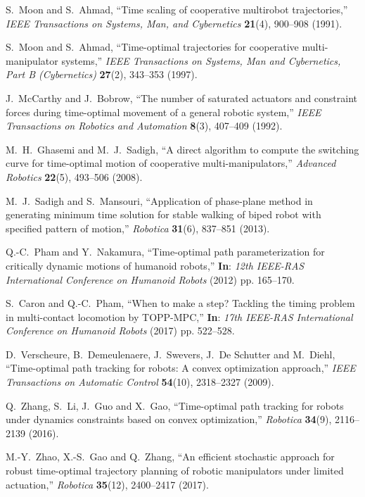 \documentclass{rob}%
\begin{document}
\begin{thebibliography}{30}
S.~Moon and S.~Ahmad, ``{Time scaling of cooperative multirobot
	trajectories},'' \emph{IEEE Transactions on Systems, Man, and Cybernetics}
\textbf{21}(4), 900--908 (1991).

S.~Moon and S.~Ahmad, ``{Time-optimal trajectories for cooperative multi-manipulator
	systems},'' \emph{IEEE Transactions on Systems, Man and Cybernetics, Part B
	(Cybernetics)} \textbf{27}(2), 343--353 (1997).

J.~McCarthy and J.~Bobrow, ``{The number of saturated actuators and constraint
	forces during time-optimal movement of a general robotic system},''
\emph{IEEE Transactions on Robotics and Automation} \textbf{8}(3), 407--409 (1992).

M.~H.~Ghasemi and M.~J.~Sadigh, ``{A direct algorithm to compute the switching
	curve for time-optimal motion of cooperative multi-manipulators},''
\emph{Advanced Robotics} \textbf{22}(5), 493--506 (2008).

M.~J.~Sadigh and S.~Mansouri, ``{Application of phase-plane method in
	generating minimum time solution for stable walking of biped robot with
	specified pattern of motion},'' \emph{Robotica} \textbf{31}(6), 837--851 (2013).

Q.-C.~Pham and Y.~Nakamura, ``{Time-optimal path parameterization for
	critically dynamic motions of humanoid robots},'' \textbf{In}: \emph{12th IEEE-RAS
	International Conference on Humanoid Robots} (2012) pp. 165--170.

S.~Caron and Q.-C.~Pham, ``{When to make a step? Tackling the timing problem in multi-contact locomotion by TOPP-MPC},'' \textbf{In}: \emph{17th IEEE-RAS
	International Conference on Humanoid Robots} (2017) pp. 522--528.

D.~Verscheure, B.~Demeulenaere, J.~Swevers, J.~{De Schutter} and M.~Diehl,
``{Time-optimal path tracking for robots: A convex optimization approach},''
\emph{IEEE Transactions on Automatic Control} \textbf{54}(10), 2318--2327 (2009).

Q.~Zhang, S.~Li, J.~Guo and X.~Gao, ``{Time-optimal path tracking for robots under dynamics constraints based on convex optimization},'' \emph{Robotica} \textbf{34}(9), 2116–2139 (2016).

M.-Y.~Zhao, X.-S.~Gao and Q.~Zhang, ``{An efficient stochastic approach for robust time-optimal trajectory planning of robotic manipulators under limited actuation},'' \emph{Robotica} \textbf{35}(12), 2400--2417 (2017).


\end{thebibliography}
\end{document}
